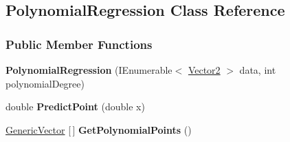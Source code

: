 \hypertarget{classDataTools_1_1regression_1_1PolynomialRegression}{}\subsection{Polynomial\+Regression Class Reference}
\label{classDataTools_1_1regression_1_1PolynomialRegression}
\subsubsection*{Public Member Functions}
\begin{DoxyCompactItemize}
\item 
\mbox{\label{classDataTools_1_1regression_1_1PolynomialRegression_aa3fbc58ba143383d0871ad14f8002cfb}} 
{\bfseries Polynomial\+Regression} (I\+Enumerable$<$ \hyperlink{classDataTools_1_1Vector2}{Vector2} $>$ data, int polynomial\+Degree)
\item 
\mbox{\label{classDataTools_1_1regression_1_1PolynomialRegression_ac5389e13f7d514bdb1f86084410a7403}} 
double {\bfseries Predict\+Point} (double x)
\item 
\mbox{\label{classDataTools_1_1regression_1_1PolynomialRegression_a5d4cd56b06140a849034cbc8622893ac}} 
\hyperlink{classDataTools_1_1GenericVector}{Generic\+Vector} \mbox{[}$\,$\mbox{]} {\bfseries Get\+Polynomial\+Points} ()
\end{DoxyCompactItemize}
